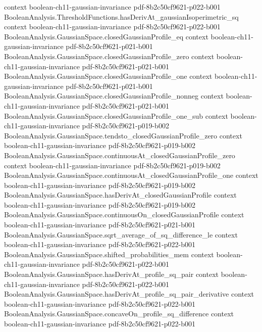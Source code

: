 \begin{theorem}
  {context}
  {boolean-ch11-gaussian-invariance}
  {pdf-8b2c50cf9621-p022-b001}
\proofstep
  {BooleanAnalysis.ThresholdFunctions.hasDerivAt_gaussianIsoperimetric_sq}
  {context}
  {boolean-ch11-gaussian-invariance}
  {pdf-8b2c50cf9621-p022-b001}
\proofstep
  {BooleanAnalysis.GaussianSpace.closedGaussianProfile_eq}
  {context}
  {boolean-ch11-gaussian-invariance}
  {pdf-8b2c50cf9621-p021-b001}
\proofstep
  {BooleanAnalysis.GaussianSpace.closedGaussianProfile_zero}
  {context}
  {boolean-ch11-gaussian-invariance}
  {pdf-8b2c50cf9621-p021-b001}
\proofstep
  {BooleanAnalysis.GaussianSpace.closedGaussianProfile_one}
  {context}
  {boolean-ch11-gaussian-invariance}
  {pdf-8b2c50cf9621-p021-b001}
\proofstep
  {BooleanAnalysis.GaussianSpace.closedGaussianProfile_nonneg}
  {context}
  {boolean-ch11-gaussian-invariance}
  {pdf-8b2c50cf9621-p021-b001}
\proofstep
  {BooleanAnalysis.GaussianSpace.closedGaussianProfile_one_sub}
  {context}
  {boolean-ch11-gaussian-invariance}
  {pdf-8b2c50cf9621-p019-b002}
\proofstep
  {BooleanAnalysis.GaussianSpace.tendsto_closedGaussianProfile_zero}
  {context}
  {boolean-ch11-gaussian-invariance}
  {pdf-8b2c50cf9621-p019-b002}
\proofstep
  {BooleanAnalysis.GaussianSpace.continuousAt_closedGaussianProfile_zero}
  {context}
  {boolean-ch11-gaussian-invariance}
  {pdf-8b2c50cf9621-p019-b002}
\proofstep
  {BooleanAnalysis.GaussianSpace.continuousAt_closedGaussianProfile_one}
  {context}
  {boolean-ch11-gaussian-invariance}
  {pdf-8b2c50cf9621-p019-b002}
\proofstep
  {BooleanAnalysis.GaussianSpace.hasDerivAt_closedGaussianProfile}
  {context}
  {boolean-ch11-gaussian-invariance}
  {pdf-8b2c50cf9621-p019-b002}
\proofstep
  {BooleanAnalysis.GaussianSpace.continuousOn_closedGaussianProfile}
  {context}
  {boolean-ch11-gaussian-invariance}
  {pdf-8b2c50cf9621-p021-b001}
\proofstep
  {BooleanAnalysis.GaussianSpace.sqrt_average_of_sq_difference_le}
  {context}
  {boolean-ch11-gaussian-invariance}
  {pdf-8b2c50cf9621-p022-b001}
\proofstep
  {BooleanAnalysis.GaussianSpace.shifted_probabilities_mem}
  {context}
  {boolean-ch11-gaussian-invariance}
  {pdf-8b2c50cf9621-p022-b001}
\proofstep
  {BooleanAnalysis.GaussianSpace.hasDerivAt_profile_sq_pair}
  {context}
  {boolean-ch11-gaussian-invariance}
  {pdf-8b2c50cf9621-p022-b001}
\proofstep
  {BooleanAnalysis.GaussianSpace.hasDerivAt_profile_sq_pair_derivative}
  {context}
  {boolean-ch11-gaussian-invariance}
  {pdf-8b2c50cf9621-p022-b001}
\proofstep
  {BooleanAnalysis.GaussianSpace.concaveOn_profile_sq_difference}
  {context}
  {boolean-ch11-gaussian-invariance}
  {pdf-8b2c50cf9621-p022-b001}
\proofstep

\end{theorem}
